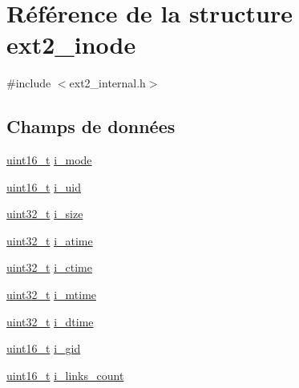 \hypertarget{structext2__inode}{\section{Référence de la structure ext2\-\_\-inode}
\label{structext2__inode}
}


{\ttfamily \#include $<$ext2\-\_\-internal.\-h$>$}

\subsection*{Champs de données}
\begin{DoxyCompactItemize}
\item 
\hyperlink{kernel_2include_2types_8h_adf4d876453337156dde61095e1f20223}{uint16\-\_\-t} \hyperlink{structext2__inode_ab18d6b6ddb4d36a2faff527b43241126}{i\-\_\-mode}
\item 
\hyperlink{kernel_2include_2types_8h_adf4d876453337156dde61095e1f20223}{uint16\-\_\-t} \hyperlink{structext2__inode_a082def4b3c1c0c5f9dce1eab8ba51189}{i\-\_\-uid}
\item 
\hyperlink{kernel_2include_2types_8h_a33594304e786b158f3fb30289278f5af}{uint32\-\_\-t} \hyperlink{structext2__inode_a2b9e2a1c732aa02b5dead0948fb47c72}{i\-\_\-size}
\item 
\hyperlink{kernel_2include_2types_8h_a33594304e786b158f3fb30289278f5af}{uint32\-\_\-t} \hyperlink{structext2__inode_adb682923fb8b418217d78fd78737406b}{i\-\_\-atime}
\item 
\hyperlink{kernel_2include_2types_8h_a33594304e786b158f3fb30289278f5af}{uint32\-\_\-t} \hyperlink{structext2__inode_a7d45cc039be5128d9771412191e55544}{i\-\_\-ctime}
\item 
\hyperlink{kernel_2include_2types_8h_a33594304e786b158f3fb30289278f5af}{uint32\-\_\-t} \hyperlink{structext2__inode_a7eb44698eabf570fee0e65d22cc5fbd1}{i\-\_\-mtime}
\item 
\hyperlink{kernel_2include_2types_8h_a33594304e786b158f3fb30289278f5af}{uint32\-\_\-t} \hyperlink{structext2__inode_a2a30cea7fb676d2fa5e9f0bd799dfa7c}{i\-\_\-dtime}
\item 
\hyperlink{kernel_2include_2types_8h_adf4d876453337156dde61095e1f20223}{uint16\-\_\-t} \hyperlink{structext2__inode_af1686b705ca7912d370d12ceaab83b8b}{i\-\_\-gid}
\item 
\hyperlink{kernel_2include_2types_8h_adf4d876453337156dde61095e1f20223}{uint16\-\_\-t} \hyperlink{structext2__inode_aa6d7753ffe6e8634bafe0b55638ee29a}{i\-\_\-links\-\_\-count}

\end{DoxyCompactItemize}

